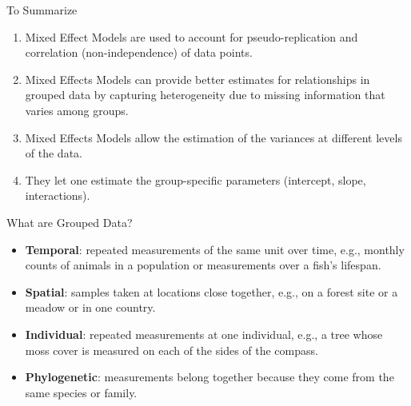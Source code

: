 \documentclass{beamer}
\begin{document}
\begin{frame}{To Summarize}

  \begin{enumerate}
      \item Mixed Effect Models are used to account for pseudo-replication and correlation (non-independence) of data points.
      \item Mixed Effects Models can provide better estimates for relationships in grouped data by capturing heterogeneity due to missing information that varies among groups.
      \item Mixed Effects Models allow the estimation of the variances at different levels of the data.
          \item They let one estimate the group-specific parameters (intercept, slope, interactions).
    \end{enumerate}
    
 \end{frame}

\begin{frame}{What are Grouped Data?}
  \begin{itemize}
    \item \textbf{Temporal}: repeated measurements of the same unit over time, e.g., monthly counts of animals in a population or measurements over a fish's lifespan.
    \item \textbf{Spatial}: samples taken at locations close together, e.g., on a forest site or a meadow or in one country.
    \item \textbf{Individual}: repeated measurements at one individual, e.g., a tree whose moss cover is measured on each of the sides of the compass.
    \item \textbf{Phylogenetic}: measurements belong together because they come from the same species or family.
  \end{itemize}
\end{frame}
\end{document}

